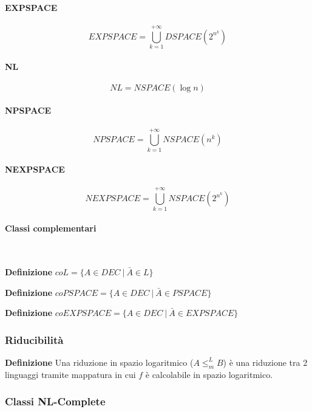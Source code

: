 \documentclass{article}
\begin{document}
\paragraph{EXPSPACE}

$$EXPSPACE=\bigcup_{k=1}^{+\infty}DSPACE(2^{n^k})$$\newline

\paragraph{NL}

$$NL=NSPACE(\log n)$$\newline

\paragraph{NPSPACE}

$$NPSPACE=\bigcup_{k=1}^{+\infty}NSPACE(n^k)$$\newline

\paragraph{NEXPSPACE}

$$NEXPSPACE=\bigcup_{k=1}^{+\infty}NSPACE(2^{n^k})$$

\paragraph{Classi complementari} $\ $\newline

\noindent\textbf{Definizione} $coL=\{A\in DEC\ |\ \bar{A}\in L\}$\newline

\noindent\textbf{Definizione} $coPSPACE=\{A\in DEC\ |\ \bar{A}\in PSPACE\}$\newline

\noindent\textbf{Definizione} $coEXPSPACE=\{A\in DEC\ |\ \bar{A}\in EXPSPACE\}$

\subsubsection{Riducibilità}

\textbf{Definizione} Una riduzione in spazio logaritmico ($A\leq_m^L B$) è una riduzione tra 2 linguaggi tramite mappatura in cui $f$ è calcolabile in spazio logaritmico.\newline

\subsubsection{Classi NL-Complete}
\end{document}
